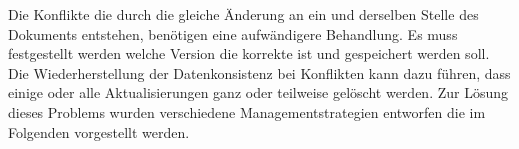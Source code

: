 Die Konflikte die durch die gleiche Änderung an ein und derselben Stelle des Dokuments entstehen, benötigen eine aufwändigere Behandlung.
Es muss festgestellt werden welche Version die korrekte ist und gespeichert werden soll.
Die Wiederherstellung der Datenkonsistenz bei Konflikten kann dazu führen, dass einige oder alle Aktualisierungen ganz oder teilweise gelöscht werden.
Zur Lösung dieses Problems wurden verschiedene Managementstrategien entworfen die im Folgenden vorgestellt werden.
%
%
